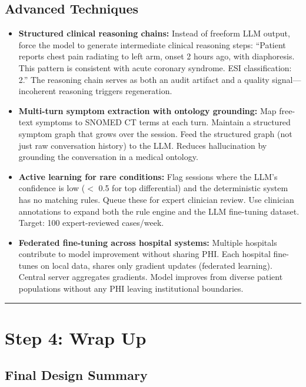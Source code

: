 \subsection*{Advanced Techniques}
\begin{itemize}
  \item \textbf{Structured clinical reasoning chains:} Instead of freeform LLM output, force the model to generate intermediate clinical reasoning steps: ``Patient reports chest pain radiating to left arm, onset 2 hours ago, with diaphoresis. This pattern is consistent with acute coronary syndrome. ESI classification: 2.'' The reasoning chain serves as both an audit artifact and a quality signal---incoherent reasoning triggers regeneration.
  \item \textbf{Multi-turn symptom extraction with ontology grounding:} Map free-text symptoms to SNOMED CT terms at each turn. Maintain a structured symptom graph that grows over the session. Feed the structured graph (not just raw conversation history) to the LLM. Reduces hallucination by grounding the conversation in a medical ontology.
  \item \textbf{Active learning for rare conditions:} Flag sessions where the LLM's confidence is low ($<$ 0.5 for top differential) and the deterministic system has no matching rules. Queue these for expert clinician review. Use clinician annotations to expand both the rule engine and the LLM fine-tuning dataset. Target: 100 expert-reviewed cases/week.
  \item \textbf{Federated fine-tuning across hospital systems:} Multiple hospitals contribute to model improvement without sharing PHI. Each hospital fine-tunes on local data, shares only gradient updates (federated learning). Central server aggregates gradients. Model improves from diverse patient populations without any PHI leaving institutional boundaries.
\end{itemize}

\bigskip\hrule\bigskip

\section*{Step 4: Wrap Up}

\subsection*{Final Design Summary}

